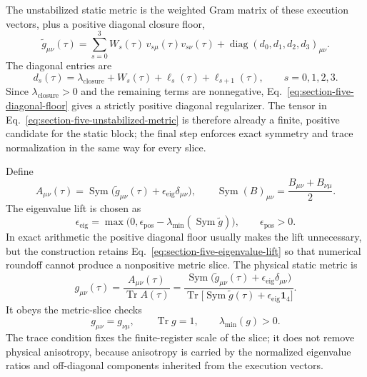 \documentclass[11pt,letterpaper]{article}
\theoremstyle{plain}
\DeclareMathOperator{\Tr}{Tr}
\DeclareMathOperator{\diag}{diag}
\begin{document}
The unstabilized static metric is the weighted Gram matrix of these execution
vectors, plus a positive diagonal closure floor,
\begin{equation}
\label{eq:section-five-unstabilized-metric}
 \widetilde g_{\mu\nu}(\tau)
 =
 \sum_{s=0}^{3}
 W_s(\tau)\,v_{s\mu}(\tau)v_{s\nu}(\tau)
 +
 \diag(d_0,d_1,d_2,d_3)_{\mu\nu}.
\end{equation}
The diagonal entries are
\begin{equation}
\label{eq:section-five-diagonal-floor}
 d_s(\tau)
 =
 \lambda_{\text{closure}}+W_s(\tau)+\ell_s(\tau)+\ell_{s+1}(\tau),
 \qquad
 s=0,1,2,3.
\end{equation}
Since $\lambda_{\text{closure}}>0$ and the remaining terms are nonnegative,
Eq.~\eqref{eq:section-five-diagonal-floor} gives a strictly positive diagonal
regularizer.  The tensor in Eq.~\eqref{eq:section-five-unstabilized-metric} is
therefore already a finite, positive candidate for the static block; the final
step enforces exact symmetry and trace normalization in the same way for every
slice.

Define
\begin{equation}
\label{eq:section-five-symmetrized-lifted-block}
 A_{\mu\nu}(\tau)
 =
 \operatorname{Sym}
 \bigl(
 \widetilde g_{\mu\nu}(\tau)+\epsilon_{\text{eig}}\delta_{\mu\nu}
 \bigr),
 \qquad
 \operatorname{Sym}(B)_{\mu\nu}
 =
 \frac{B_{\mu\nu}+B_{\nu\mu}}{2}.
\end{equation}
The eigenvalue lift is chosen as
\begin{equation}
\label{eq:section-five-eigenvalue-lift}
 \epsilon_{\text{eig}}
 =
 \max\!\bigl(0,\epsilon_{\text{pos}}
 -\lambda_{\min}(\operatorname{Sym}\widetilde g)\bigr),
 \qquad
 \epsilon_{\text{pos}}>0.
\end{equation}
In exact arithmetic the positive diagonal floor usually makes the lift
unnecessary, but the construction retains Eq.~\eqref{eq:section-five-eigenvalue-lift} so
that numerical roundoff cannot produce a nonpositive metric slice.  The
physical static metric is
\begin{equation}
\label{eq:section-five-stabilized-trace-normalized-metric}
 \boxed{
 g_{\mu\nu}(\tau)
 =
 \frac{A_{\mu\nu}(\tau)}{\Tr A(\tau)}
 =
 \frac{
 \operatorname{Sym}
 \bigl(\widetilde g_{\mu\nu}(\tau)+\epsilon_{\text{eig}}\delta_{\mu\nu}\bigr)}
 {\Tr\!\bigl[
 \operatorname{Sym}\widetilde g(\tau)
 +\epsilon_{\text{eig}}\mathbf{1}_4\big]}.
 }
\end{equation}
It obeys the metric-slice checks
\begin{equation}
\label{eq:section-five-metric-checks}
 g_{\mu\nu}=g_{\nu\mu},
 \qquad
 \Tr g=1,
 \qquad
 \lambda_{\min}(g)>0.
\end{equation}
The trace condition fixes the finite-register scale of the slice; it does not
remove physical anisotropy, because anisotropy is carried by the normalized
eigenvalue ratios and off-diagonal components inherited from the execution
vectors.
\end{document}
